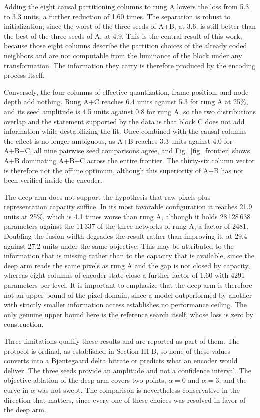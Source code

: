 \documentclass[conference]{IEEEtran}
\begin{document}
Adding the eight causal partitioning columns to rung A lowers the loss from 5.3 to
3.3 units, a further reduction of 1.60 times. The separation is robust to
initialization, since the worst of the three seeds of A+B, at 3.6, is still better
than the best of the three seeds of A, at 4.9. This is the central result of this
work, because those eight columns describe the partition choices of the already
coded neighbors and are not computable from the luminance of the block under any
transformation. The information they carry is therefore produced by the encoding
process itself.

Conversely, the four columns of effective quantization, frame position, and node
depth add nothing. Rung A+C reaches 6.4 units against 5.3 for rung A at 25\%, and
its seed amplitude is 4.5 units against 0.8 for rung A, so the two distributions
overlap and the statement supported by the data is that block C does not add
information while destabilizing the fit. Once combined with the causal columns the
effect is no longer ambiguous, as A+B reaches 3.3 units against 4.0 for A+B+C, all
nine pairwise seed comparisons agree, and Fig.~\ref{fig_frontier} shows A+B
dominating A+B+C across the entire frontier. The thirty-six column vector is therefore not the offline optimum,
although this superiority of A+B has not been verified inside the encoder.

The deep arm does not support the hypothesis that raw pixels plus representation
capacity suffice. In its most favorable configuration it reaches 21.9 units at
25\%, which is 4.1 times worse than rung A, although it holds 28\,128\,638
parameters against the 11\,337 of the three networks of rung A, a factor of 2481.
Doubling the fusion width degrades the result rather than improving it, at 29.4
against 27.2 units under the same objective. This may be attributed to the
information that is missing rather than to the capacity that is available, since
the deep arm reads the same pixels as rung A and the gap is not closed by
capacity, whereas eight columns of encoder state close a further factor of 1.60
with 4291 parameters per level. It is important to emphasize that the deep arm is
therefore not an upper bound of the pixel domain, since a model outperformed by
another with strictly smaller information access establishes no performance
ceiling. The only genuine upper bound here is the reference search itself, whose
loss is zero by construction.

Three limitations qualify these results and are reported as part of them. The
protocol is ordinal, as established in Section III-B, so none of these values
converts into a Bj\o ntegaard delta bitrate or predicts what an encoder would
deliver. The three seeds provide an amplitude and not a confidence interval. The
objective ablation of the deep arm covers two points, $\alpha = 0$ and
$\alpha = 3$, and the curve in $\alpha$ was not swept. The comparison is
nevertheless conservative in the direction that matters, since every one of these
choices was resolved in favor of the deep arm.
\end{document}
